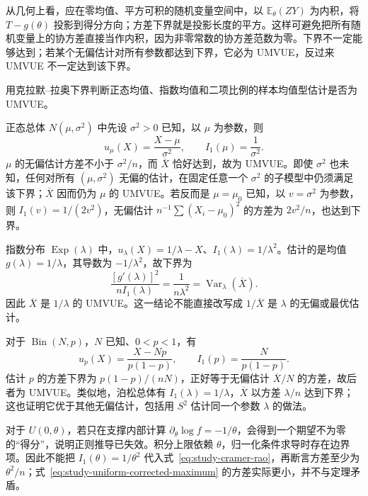 从几何上看，应在零均值、平方可积的随机变量空间中，以 $\mathbb E_\theta(ZY)$ 为内积，将 $T-g(\theta)$ 投影到得分方向；方差下界就是投影长度的平方。这样可避免把所有随机变量上的协方差直接当作内积，因为非零常数的协方差范数为零。下界不一定能够达到；若某个无偏估计对所有参数都达到下界，它必为 UMVUE，反过来 UMVUE 不一定达到该下界。

\begin{example}
\label{ex:study-cramer-rao-applications}
用克拉默--拉奥下界判断正态均值、指数均值和二项比例的样本均值型估计是否为 UMVUE。
\end{example}

\begin{solve}
正态总体 $N(\mu,\sigma^2)$ 中先设 $\sigma^2>0$ 已知，以 $\mu$ 为参数，则
\[
  u_\mu(X)=\frac{X-\mu}{\sigma^2},\qquad
  I_1(\mu)=\frac1{\sigma^2}.
\]
$\mu$ 的无偏估计方差不小于 $\sigma^2/n$，而 $\overline X$ 恰好达到，故为 UMVUE。即使 $\sigma^2$ 也未知，任何对所有 $(\mu,\sigma^2)$ 无偏的估计，在固定任意一个 $\sigma^2$ 的子模型中仍须满足该下界；$\overline X$ 因而仍为 $\mu$ 的 UMVUE。若反而是 $\mu=\mu_0$ 已知，以 $v=\sigma^2$ 为参数，则 $I_1(v)=1/(2v^2)$，无偏估计 $n^{-1}\sum(X_i-\mu_0)^2$ 的方差为 $2v^2/n$，也达到下界。

指数分布 $\operatorname{Exp}(\lambda)$ 中，$u_\lambda(X)=1/\lambda-X$、$I_1(\lambda)=1/\lambda^2$。估计的是均值 $g(\lambda)=1/\lambda$，其导数为 $-1/\lambda^2$，故下界为
\[
  \frac{[g'(\lambda)]^2}{nI_1(\lambda)}
    =\frac1{n\lambda^2}
    =\operatorname{Var}_\lambda(\overline X).
\]
因此 $\overline X$ 是 $1/\lambda$ 的 UMVUE。这一结论不能直接改写成 $1/\overline X$ 是 $\lambda$ 的无偏或最优估计。

对于 $\operatorname{Bin}(N,p)$，$N$ 已知、$0<p<1$，有
\[
  u_p(X)=\frac{X-Np}{p(1-p)},\qquad
  I_1(p)=\frac{N}{p(1-p)}.
\]
估计 $p$ 的方差下界为 $p(1-p)/(nN)$，正好等于无偏估计 $\overline X/N$ 的方差，故后者为 UMVUE。类似地，泊松总体有 $I_1(\lambda)=1/\lambda$，$\overline X$ 以方差 $\lambda/n$ 达到下界；这也证明它优于其他无偏估计，包括用 $S^2$ 估计同一个参数 $\lambda$ 的做法。
\end{solve}

\begin{notealert}[type=caution,title={支撑依赖参数时不能机械套用下界}]
对于 $U(0,\theta)$，若只在支撑内部计算 $\partial_\theta\log f=-1/\theta$，会得到一个期望不为零的“得分”，说明正则推导已失效。积分上限依赖 $\theta$，归一化条件求导时存在边界项。因此不能把 $I_1(\theta)=1/\theta^2$ 代入式~\eqref{eq:study-cramer-rao}，再断言方差至少为 $\theta^2/n$；式~\eqref{eq:study-uniform-corrected-maximum} 的方差实际更小，并不与定理矛盾。
\end{notealert}

